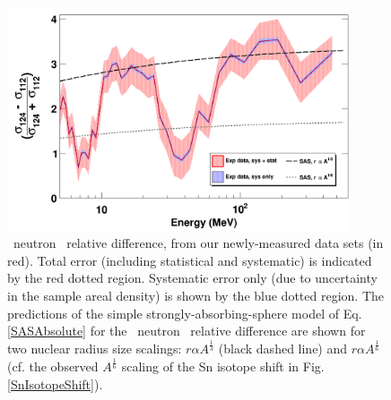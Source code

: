 \begin{figure}[ht!]
    \centering
    \includegraphics[width=0.9\textwidth]{figures/relativeDiff_Sn124Sn112.png}
    \caption[\snTwelveFour\ neutron \tot\ relative difference]
    {
        \snTwelveFour\ neutron \tot\ relative difference, from our newly-measured
        data sets (in red). Total error (including statistical and systematic)
        is indicated by the red dotted region. Systematic error only (due to
        uncertainty in the sample areal density) is shown by the blue dotted region.   
        The predictions of the simple strongly-absorbing-sphere model of
        Eq. \ref{SASAbsolute} for the \snTwelveFour\ neutron \tot\ relative
        difference are shown for two nuclear radius size scalings: $r \alpha A^{\frac{1}{3}}$
        (black dashed line) and $r \alpha A^{\frac{1}{6}}$
        (cf. the observed $A^{\frac{1}{6}}$ scaling of the Sn isotope shift in Fig.
        \ref{SnIsotopeShift}).
    }
    \label{IsotopicDifferenceSn}
\end{figure}

\afterpage{\clearpage}
